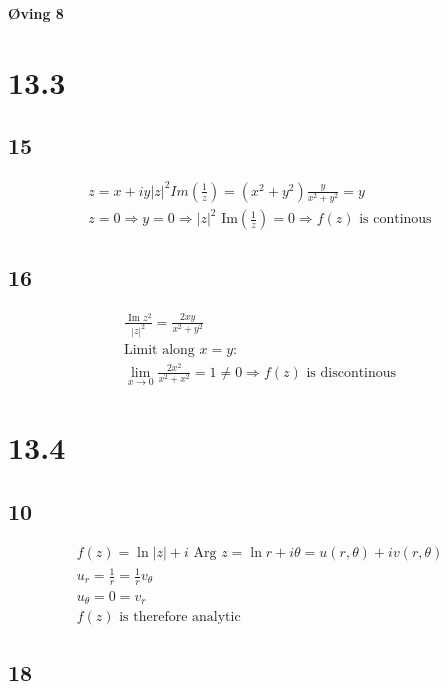 \begin{center}
	\LARGE{\textbf{Øving 8}}
\end{center}


\section*{13.3}

\subsection*{15}


\begin{gather*}
	z = x + i y
	|z|^2 Im \left(\frac{1}{z}\right)
	=
	\left(x^2 + y^2\right) \frac{y}{x^2 + y^2}
	=
	y
	\\
	z = 0 \Rightarrow y = 0 \Rightarrow |z|^2 \text{ Im} \left(\frac{1}{z}\right) = 0
	\Rightarrow f(z) \text{ is continous}
\end{gather*}


\subsection*{16}


\begin{gather*}
	\frac{\text{ Im } z^2}{|z|^2}
	=
	\frac{2 x y}{x^2 + y^2}
	\\
	\text{Limit along } x = y:
	\\
	\lim_{x \rightarrow 0}{\frac{2 x^2}{x^2 + x^2}}
	=
	1 \neq 0 \Rightarrow f(z) \text{ is discontinous}
\end{gather*}


\section*{13.4}

\subsection*{10}


\begin{gather*}
	f(z) = \ln{|z|} + i \text{ Arg } z = \ln{r} + i \theta = u(r, \theta) + i v(r, \theta)
	\\
	u_r = \frac{1}{r} = \frac{1}{r} v_\theta
	\\
	u_\theta = 0 = v_r
	\\
	f(z) \text{ is therefore analytic}
\end{gather*}


\subsection*{18}


